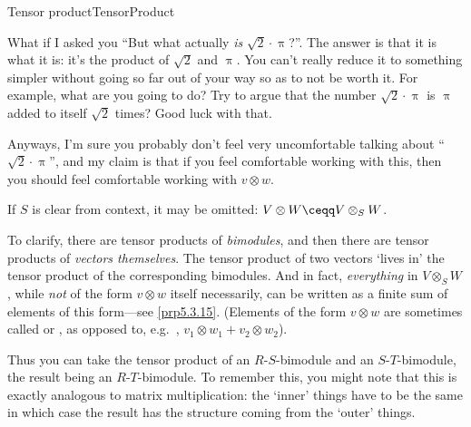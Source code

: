 \begin{thm}{Tensor product}{TensorProduct}
\begin{rmk}
		What if I asked you ``But what actually \emph{is} $\sqrt{2}\cdot \uppi$?''.  The answer is that it is what it is:  it's the product of $\sqrt{2}$ and $\uppi$.  You can't really reduce it to something simpler without going so far out of your way so as to not be worth it.  For example, what are you going to do?  Try to argue that the number $\sqrt{2}\cdot \uppi$ is $\uppi$ added to itself $\sqrt{2}$ times?  Good luck with that.
		
		Anyways, I'm sure you probably don't feel very uncomfortable talking about ``$\sqrt{2}\cdot \uppi$'', and my claim is that if you feel comfortable working with this, then you should feel comfortable working with $v\otimes w$.
	\end{rmk}
	\begin{rmk}
		If $S$ is clear from context, it may be omitted:  $V\otimes W\ceqq V\otimes _SW$.
	\end{rmk}
	\begin{rmk}
		To clarify, there are tensor products of \emph{bimodules}, and then there are tensor products of \emph{vectors themselves}.  The tensor product of two vectors `lives in' the tensor product of the corresponding bimodules.  And in fact, \emph{everything} in $V\otimes _SW$, while \emph{not} of the form $v\otimes w$ itself necessarily, can be written as a finite sum of elements of this form---see \cref{prp5.3.15}.  (Elements of the form $v\otimes w$ are sometimes called  or , as opposed to, e.g.~, $v_1\otimes w_1+v_2\otimes w_2$).
	\end{rmk}
	\begin{rmk}
		Thus you can take the tensor product of an $R$-$S$-bimodule and an $S$-$T$-bimodule, the result being an $R$-$T$-bimodule.  To remember this, you might note that this is exactly analogous to matrix multiplication:  the `inner' things have to be the same in which case the result has the structure coming from the `outer' things.
		

\end{rmk}
\end{thm}
